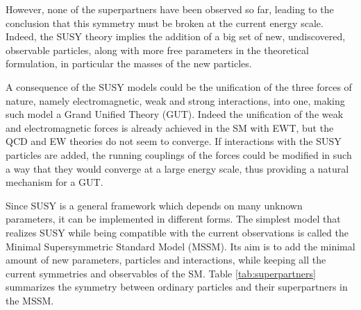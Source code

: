 However, none of the superpartners have been observed so far, leading to the conclusion that this symmetry must be broken at the current energy scale. Indeed, the SUSY theory implies the addition of a big set of new, undiscovered, observable particles, along with more free parameters in the theoretical formulation, in particular the masses of the new particles.\newline

A consequence of the SUSY models could be the unification of the three forces of nature, namely electromagnetic, weak and strong interactions, into one, making such model a Grand Unified Theory (GUT). Indeed the unification of the weak and electromagnetic forces is already achieved in the SM with EWT, but the QCD and EW theories do not seem to converge. If interactions with the SUSY particles are added, the running couplings of the forces could be modified in such a way that they would converge at a large energy scale, thus providing a natural mechanism for a GUT.\newline

Since SUSY is a general framework which depends on many unknown parameters, it can be implemented in different forms. The simplest model that realizes SUSY while being compatible with the current observations is called the Minimal Supersymmetric Standard Model (MSSM). Its aim is to add the minimal amount of new parameters, particles and interactions, while keeping all the current symmetries and observables of the SM. Table \ref{tab:superpartners} summarizes the symmetry between ordinary particles and their superpartners in the MSSM.\newline

